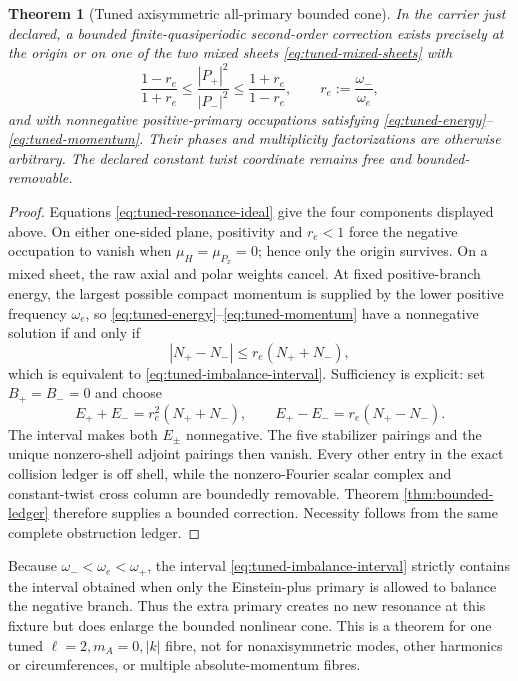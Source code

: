 \documentclass[11pt]{article}
\newtheorem{theorem}{Theorem}[section]
\theoremstyle{definition}
\theoremstyle{remark}
\begin{document}
\begin{theorem}[Tuned axisymmetric all-primary bounded cone]
\label{thm:tuned-all-primary-bounded}
In the carrier just declared, a bounded finite-quasiperiodic second-order
correction exists precisely at the origin or on one of the two mixed sheets
\eqref{eq:tuned-mixed-sheets} with
\begin{equation}\label{eq:tuned-imbalance-interval}
 \frac{1-r_e}{1+r_e}
 \leq \frac{|P_+|^2}{|P_-|^2}
 \leq \frac{1+r_e}{1-r_e},
 \qquad r_e:=\frac{\omega_-}{\omega_e},
\end{equation}
and with nonnegative positive-primary occupations satisfying
\eqref{eq:tuned-energy}--\eqref{eq:tuned-momentum}.  Their phases and
multiplicity factorizations are otherwise arbitrary.  The declared constant
twist coordinate remains free and bounded-removable.
\end{theorem}

\begin{proof}
Equations \eqref{eq:tuned-resonance-ideal} give the four components displayed
above.  On either one-sided plane, positivity and \(r_e<1\)
force the negative occupation to vanish when \(\mu_H=\mu_{P_x}=0\); hence
only the origin survives.  On a mixed sheet, the raw axial and polar weights
cancel.  At fixed positive-branch energy, the largest possible compact
momentum is supplied by the lower positive frequency \(\omega_e\), so
\eqref{eq:tuned-energy}--\eqref{eq:tuned-momentum} have a nonnegative solution
if and only if
\begin{equation}
 |N_+-N_-|\leq r_e(N_++N_-),
\end{equation}
which is equivalent to \eqref{eq:tuned-imbalance-interval}.  Sufficiency is
explicit: set \(B_+=B_-=0\) and choose
\begin{equation}
 E_++E_-=r_e^2(N_++N_-),\qquad
 E_+-E_-=r_e(N_+-N_-).
\end{equation}
The interval makes both \(E_\pm\) nonnegative.  The five stabilizer pairings
and the unique nonzero-shell adjoint pairings then vanish.  Every other entry
in the exact collision ledger is off shell, while the nonzero-Fourier scalar
complex and constant-twist cross column are boundedly removable.  Theorem
\ref{thm:bounded-ledger} therefore supplies a bounded correction.  Necessity
follows from the same complete obstruction ledger.
\end{proof}

Because \(\omega_-<\omega_e<\omega_+\), the interval
\eqref{eq:tuned-imbalance-interval} strictly contains the interval obtained
when only the Einstein-plus primary is allowed to balance the negative
branch.  Thus the extra primary creates no new resonance at this fixture but
does enlarge the bounded nonlinear cone.  This is a theorem for one tuned
\(\ell=2,m_A=0,|k|\) fibre, not for nonaxisymmetric modes, other harmonics or
circumferences, or multiple absolute-momentum fibres.
\end{document}
